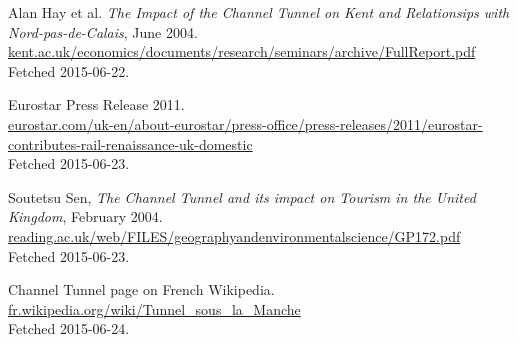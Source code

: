 \documentclass[12pt]{article} %
\begin{document}
\begin{thebibliography}{99}
	Alan Hay et al. \textit{The Impact of the Channel Tunnel on Kent and Relationsips with Nord-pas-de-Calais}, June 2004.\\
	\url{kent.ac.uk/economics/documents/research/seminars/archive/FullReport.pdf}\\
	Fetched 2015-06-22.

	Eurostar Press Release 2011.\\
	\url{eurostar.com/uk-en/about-eurostar/press-office/press-releases/2011/eurostar-contributes-rail-renaissance-uk-domestic}\\
	Fetched 2015-06-23.

	Soutetsu Sen, \emph{The Channel Tunnel and its impact on
Tourism in the United Kingdom}, February 2004.\\
	\url{reading.ac.uk/web/FILES/geographyandenvironmentalscience/GP172.pdf}\\
	Fetched 2015-06-23.

	Channel Tunnel page on French Wikipedia.\\
	\url{fr.wikipedia.org/wiki/Tunnel_sous_la_Manche}\\
	Fetched 2015-06-24.

\end{thebibliography}
\end{document}
